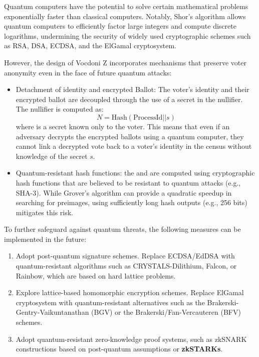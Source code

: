 Quantum computers have the potential to solve certain mathematical problems exponentially faster than classical computers. Notably, Shor's algorithm allows quantum computers to efficiently factor large integers and compute discrete logarithms, undermining the security of widely used cryptographic schemes such as RSA, DSA, ECDSA, and the ElGamal cryptosystem.

However, the design of Vocdoni Z incorporates mechanisms that preserve voter anonymity even in the face of future quantum attacks:

\begin{itemize}
	\item Detachment of identity and encrypted Ballot: The voter's identity and their encrypted ballot are decoupled through the use of a secret in the nullifier. The nullifier is computed as:
	$$ N = \text{Hash}(\text{ProcessId} || s) $$	
	where is a secret known only to the voter. This means that even if an adversary decrypts the encrypted ballots using a quantum computer, they cannot link a decrypted vote back to a voter's identity in the census without knowledge of the secret $s$.
	\item Quantum-resistant hash functions: the \nullifier and \commitment are computed using cryptographic hash functions that are believed to be resistant to quantum attacks (e.g., SHA-3). While Grover's algorithm can provide a quadratic speedup in searching for preimages, using sufficiently long hash outputs (e.g., 256 bits) mitigates this risk.
\end{itemize}

To further safeguard against quantum threats, the following measures can be implemented in the future:

\begin{enumerate}
	\item Adopt post-quantum signature schemes. Replace ECDSA/EdDSA with quantum-resistant algorithms such as CRYSTALS-Dilithium, Falcon, or Rainbow, which are based on hard lattice problems.
	
	\item Explore lattice-based homomorphic encryption schemes. Replace ElGamal cryptosystem with quantum-resistant alternatives such as the Brakerski-Gentry-Vaikuntanathan (BGV) or the Brakerski/Fan-Vercauteren (BFV) schemes.
	
	\item Adopt quantum-resistant zero-knowledge proof systems, such as zkSNARK constructions based on post-quantum assumptions or \textbf{zkSTARKs}.
\end{enumerate}


